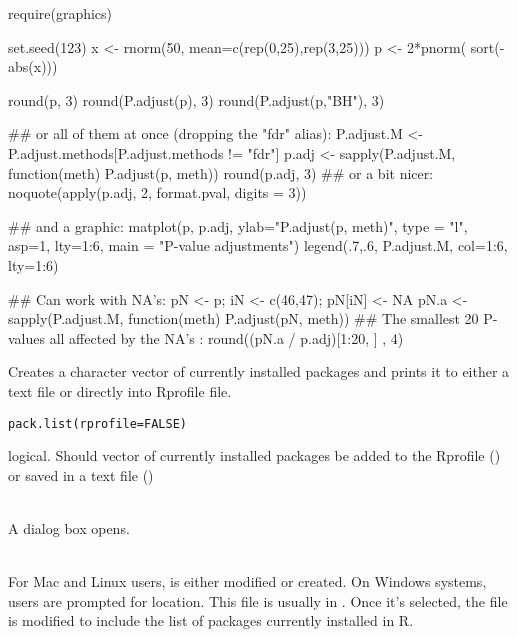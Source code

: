 \documentclass[a4paper]{book}
\begin{document}
\begin{Examples}
\begin{ExampleCode}
require(graphics)

set.seed(123)
x <- rnorm(50, mean=c(rep(0,25),rep(3,25)))
p <- 2*pnorm( sort(-abs(x)))

round(p, 3)
round(P.adjust(p), 3)
round(P.adjust(p,"BH"), 3)

## or all of them at once (dropping the "fdr" alias):
P.adjust.M <- P.adjust.methods[P.adjust.methods != "fdr"]
p.adj <- sapply(P.adjust.M, function(meth) P.adjust(p, meth))
round(p.adj, 3)
## or a bit nicer:
noquote(apply(p.adj, 2, format.pval, digits = 3))

## and a graphic:
matplot(p, p.adj, ylab="P.adjust(p, meth)", type = "l", asp=1, lty=1:6,
        main = "P-value adjustments")
legend(.7,.6, P.adjust.M, col=1:6, lty=1:6)

## Can work with NA's:
pN <- p; iN <- c(46,47); pN[iN] <- NA
pN.a <- sapply(P.adjust.M, function(meth) P.adjust(pN, meth))
## The smallest 20 P-values all affected by the NA's :
round((pN.a / p.adj)[1:20, ] , 4)
\end{ExampleCode}
\end{Examples}
\newpage
{}
%
\begin{Description}\relax
Creates a character vector of currently installed packages and prints it to either a text file or directly into Rprofile file.
\end{Description}
%
\begin{Usage}
\begin{verbatim}
pack.list(rprofile=FALSE)
\end{verbatim}
\end{Usage}
%
\begin{Arguments}
\begin{ldescription}
\item[\code{rprofile}] 
logical. Should vector of currently installed packages be added to the Rprofile () or saved in a text file ()

\end{ldescription}
\end{Arguments}
%
\begin{Details}\relax
{}\\{}
A  dialog box opens.


\\{}
For Mac and Linux users,  is either modified or created. On Windows systems, users are prompted for 
 location. This file is usually in . Once it's selected, 
the file is modified to include the list of packages currently installed in R.

\end{Details}
\end{document}
